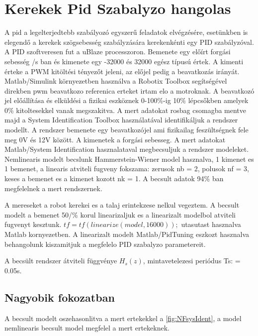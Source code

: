 \section{Kerekek Pid Szabalyzo hangolas}

A pid a legelterjedtebb szabályozó egyszerű feladatok elvégzésére, esetünkben is elegendő a kerekek szögsebesség szabályzására kerekenkénti egy PID szabályzóval. A PID szoftveresen fut a uBlaze processzoron. Bemenete egy előírt forgási sebesség \degree/s ban és kimenete egy -32000 és 32000 egész típusú értek. A kimenti érteke a PWM kitöltési tényezőt jeleni, az előjel pedig a beavatkozás irányát.
Matlab/Simulink környezetben használva a Robotix Toolbox segítségével direkben pwm beavatkozo referenica erteket irtam elo a motroknak. A beavatkozó jel előállítása és elküldési a fizikai eszköznek 0-100\%-ig 10\% lépcsőkben amelyek 0\% kitoltesekkel vanak megszakitva. A mert adatokat rosbag csomagba mentve majd a System Identification Toolbox használatával identifikáljuk a rendszer modellt. A rendszer bemenete egy beavatkozójel ami fizikailag feszültségnek fele meg 0V és 12V között. A kimenetek a forgási sebesseg.
A mert adatokat Matlab/System Identification hasznalataval megbecsuljuk a rendszer modeleket. Nemlinearis modelt becslunk 
Hammerstein-Wiener model \cite{matlabhwmmodel} hasznalva, 1 kimenet es 1 bemenet, a linearis atviteli fugveny fokszama:
zerusok nb = 2, polusok nf = 3, keses a bemenet es a kimenet kozott nk = 1. A becsult adatok 94\% ban megfelelnek a mert rendszernek.          

A mereseket a robot kerekei es a talaj erintekzese nelkul vegeztem.
A becsult modelt a bemenet 50/\%  korul linearizaljuk es a linearizalt modelbol atviteli fugvenyt kesztunk. 
$tf = tf(linearize(model,16000));$ utasutast hasznalva Matlab kornyezetben. A linearizalt modelt Matlab/PidTuning eszkozt hasznalva behangolunk kiszamitjuk a megfelelo PID szabalyzo parametereit.



A becsült rendszer átviteli függvénye $H_s(z)$, mintavetelezesi periódus Ts: = 0.05s.

\subsection*{Nagyobik fokozatban}

A becsult modelt oszehasonlitva a mert ertekekkel a \ref{fig:NFsysIdent}, a model nemlinearis becsult model megfelel a mert ertekeknek.

